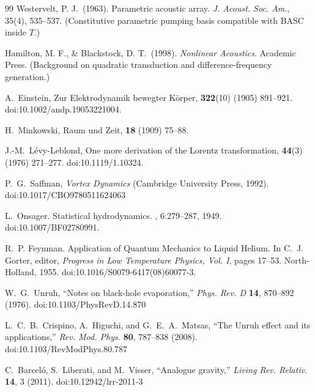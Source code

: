 \begin{thebibliography}{99}
    Westervelt, P. J.\ (1963).
    Parametric acoustic array.
    \emph{J. Acoust. Soc. Am.}, 35(4), 535–537.
    (Constitutive parametric pumping basis compatible with BASC inside $T$.)

    Hamilton, M. F., \& Blackstock, D. T.\ (1998).
    \emph{Nonlinear Acoustics}. Academic Press.
    (Background on quadratic transduction and difference-frequency generation.)


    A.~Einstein,
    \newblock Zur Elektrodynamik bewegter K{\"o}rper,
     \textbf{322}(10) (1905) 891--921.
    \newblock doi:10.1002/andp.19053221004.

    H.~Minkowski,
    \newblock Raum und Zeit,
     \textbf{18} (1909) 75--88.

    J.-M.~L{\'e}vy-Leblond,
    \newblock One more derivation of the Lorentz transformation,
     \textbf{44}(3) (1976) 271--277.
    \newblock doi:10.1119/1.10324.

    P.~G.~Saffman,
    \emph{Vortex Dynamics}
    (Cambridge University Press, 1992).
    doi:10.1017/CBO9780511624063

    L.~Onsager.
    \newblock Statistical hydrodynamics.
    , 6:279--287, 1949.
    \newblock doi:10.1007/BF02780991.

    R.~P. Feynman.
    \newblock Application of Quantum Mechanics to Liquid Helium.
    \newblock In C.~J. Gorter, editor, {\em Progress in Low Temperature Physics, Vol. I}, pages 17--53. North-Holland, 1955.
    \newblock doi:10.1016/S0079-6417(08)60077-3.

    W.~G.~Unruh,
    ``Notes on black-hole evaporation,''
    \textit{Phys. Rev. D} \textbf{14}, 870--892 (1976).
    doi:10.1103/PhysRevD.14.870

    L.~C.~B.~Crispino, A.~Higuchi, and G.~E.~A.~Matsas,
    ``The Unruh effect and its applications,''
    \textit{Rev. Mod. Phys.} \textbf{80}, 787--838 (2008).
    doi:10.1103/RevModPhys.80.787

    C.~Barcel\'o, S.~Liberati, and M.~Visser,
    ``Analogue gravity,''
    \textit{Living Rev. Relativ.} \textbf{14}, 3 (2011).
    doi:10.12942/lrr-2011-3


\end{thebibliography}
